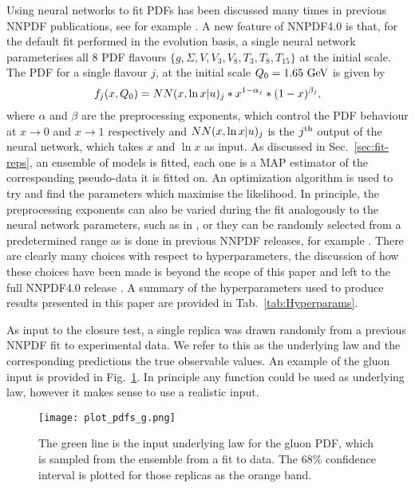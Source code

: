 Using neural networks to fit PDFs has been discussed many times in previous
NNPDF publications, see for example \cite{nnpdf30, Ball_2017}. A new feature of
NNPDF4.0 is that, for the default fit performed in the evolution basis, a
single neural network parameterises all 8 PDF flavours $\{ g, \Sigma, V, V_3,
V_8, T_3, T_8, T_{15} \}$ at the initial scale. The PDF for a single flavour $j$,
at the initial scale $Q_0 = 1.65~{\rm GeV}$ is given by
\begin{equation}
    f_j(x, Q_0) = NN(x, \ln x | u)_j * x^{1-\alpha_j} * (1-x)^{\beta_j},
\end{equation}
where $\alpha$ and $\beta$ are the preprocessing exponents, which control the
PDF behaviour at $x \to 0$ and $x \to 1$ respectively and $NN(x, \ln x |
u)_j$ is the $j^{\rm th}$ output of the neural network, which takes $x$
and $\ln x$ as input. As discussed in Sec.~\ref{sec:fit-reps}, an ensemble of
models is fitted, each one is a MAP estimator of the corresponding pseudo-data
it is fitted on. 
An optimization algorithm is used to try and find the parameters which maximise the likelihood.
In principle, the preprocessing exponents can also be varied during the fit
analogously to the neural network parameters, such as in \cite{Carrazza_2019},
or they can be randomly selected from a predetermined range as is done in
previous NNPDF releases, for example \cite{Ball_2017}. There are clearly many
choices with respect to hyperparameters, the discussion of how these choices
have been made is beyond the scope of this paper and left to the full NNPDF4.0
release \cite{NNPDF40}. A summary of the hyperparameters used to produce results
presented in this paper are provided in Tab.~\ref{tab:Hyperparams}.


As input to the closure test, a single replica was drawn randomly from a
previous NNPDF fit to experimental data. We refer to this as the underlying law
and the corresponding predictions the true observable values. An example of the
gluon input is provided in Fig.~\ref{fig:InputGluonPDF}. In principle any
function could be used as underlying law, however it makes sense to use a
realistic input.

\begin{figure}
    \centering
    \texttt{[image: plot\_pdfs\_g.png]}
    \caption{The green line is the input underlying law for the gluon PDF,
    which is sampled from the ensemble from a fit to data. The 68\% confidence
    interval is plotted for those replicas as the orange band.}
    \label{fig:InputGluonPDF}
\end{figure}

